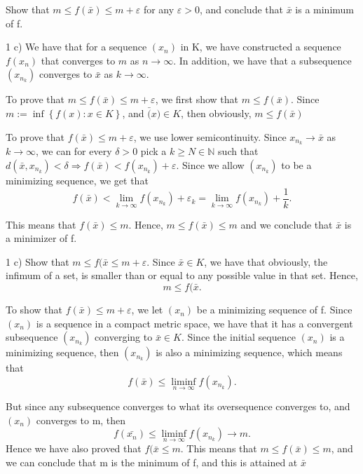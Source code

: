 \documentclass[a4paper,norsk]{article}
\renewcommand{\geq}{\geqslant}
\renewcommand{\leq}{\leqslant}
\renewcommand{\epsilon}{\varepsilon}
\begin{document}
Show that $ m \leq f( \bar{x}) \leq m + \epsilon  $ for any $ \epsilon > 0 $, and conclude that $ \bar{x} $ is a minimum of f.

\begin{proofbox}{1 c)}{}
    We have that for a sequence $ \left( x_n \right)  $ in K, we have constructed a sequence $ f(x_n) $ that converges to $ m $ as $ n \to \infty $. In addition, we have that a subsequence $ \left( x_{n_k} \right)  $  converges to $ \bar{x} $ as $ k \to \infty $. 
    
    

    To prove that $ m \leq  f( \bar{x} ) \leq  m + \epsilon  $, we first show that $ m \leq f( \bar{x}) $. Since $ m := \inf \left\{ f(x) :  x \in K \right\}  $, and $ \bar(x) \in K $, then obviously, $ m \leq  f( \bar{x}) $


    To prove that $ f( \bar{x}) \leq  m+ \epsilon  $, we use lower semicontinuity. Since $ x_{n_k} \to \bar{x} $ as $ k \to \infty $, we can for every $ \delta > 0 $  pick a $ k \geq  N \in \mathbb{N} $ such that $ d \left( \bar{x}, x_{n_k} \right) < \delta \Rightarrow f( \bar{x}) < f(x_{n_k}) + \epsilon   $. Since we allow $ \left( x_{n_k} \right)  $ to be a minimizing sequence, we get that 
    \[
        f(\bar{x}) < \lim_{k \to \infty} f( x_{n_k}) + \epsilon _k =  \lim_{k \to \infty} f( x_{n_k}) + \frac{ 1 }{ k }.
    \]

    This means that $ f (\bar{x}) \leq  m $. Hence, $ m \leq  f (\bar{x}) \leq m $  and we conclude that $ \bar{x} $ is a minimizer of f.
    
\end{proofbox}


\begin{proofbox}{1 c)}{}
  Show that $ m \leq  f(\bar{x} \leq  m + \epsilon  $. Since $ \bar{x} \in K $, we have that obviously, the infimum of a set, is smaller than or equal to any possible value in that set. Hence,
  \[
    m \leq f(\bar{x}.
  \]
  

  To show that $ f \left( \bar{x} \right) \leq  m + \epsilon   $, we let $ \left( x_n \right)  $ be a minimizing sequence of f. Since $ \left( x_n \right)  $ is a sequence in a compact metric space, we have that it has a convergent subsequence $ \left( x_{n_k} \right)  $ converging to $ \bar{x} \in K $. Since the initial sequence $ \left( x_n \right)  $ is a minimizing sequence, then $ \left( x_{n_k} \right)  $ is also a minimizing sequence, which means that
  \[
      f(\bar{x}) \leq \liminf_{n \to \infty} f \left( x_{n_k} \right).
  \]
  

  But since any subsequence converges to what its oversequence converges to, and $ \left( x_n \right)  $ converges to m, then 
  \[
      f(\bar{x_n}) \leq \liminf_{n \to \infty} f \left( x_{n_k} \right) \to m.
  \]
  Hence we have also proved that $ f(\bar{x} \leq  m $. This means that $ m \leq  f(\bar{x}) \leq  m $, and we can conclude that m is the minimum of f, and this is attained at $ \bar{x} $ 
\end{proofbox}
\end{document}
